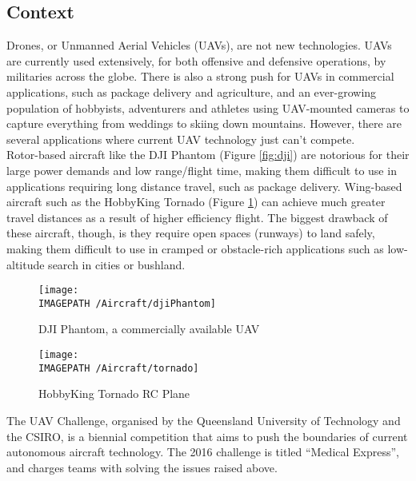 \subsection{Context}
Drones, or Unmanned Aerial Vehicles (UAVs), are not new technologies. UAVs are currently used extensively, for both offensive\cite{ref:offence} and defensive\cite{ref:defence} operations, by militaries across the globe. There is also a strong push for UAVs in commercial applications, such as package delivery\cite{ref:package} and agriculture\cite{ref:agriculture}, and an ever-growing population of hobbyists\cite{ref:hobby}, adventurers\cite{ref:adventure} and athletes\cite{ref:sport} using UAV-mounted cameras to capture everything from weddings to skiing down mountains. However, there are several applications where current UAV technology just can't compete.\\

Rotor-based aircraft like the DJI Phantom (Figure \ref{fig:dji}) are notorious for their  large power demands and low range/flight time, making them difficult to use in applications requiring long distance travel, such as package delivery. Wing-based aircraft such as the HobbyKing Tornado\cite{ref:tornado} (Figure \ref{fig:tornado}) can achieve much greater travel distances as a result of higher efficiency flight. The biggest drawback of these aircraft, though, is they require open spaces (runways) to land safely, making them difficult to use in cramped or obstacle-rich applications such as low-altitude search in cities or bushland.

\begin{figure}[!ht]
	\centering
	\begin{minipage}{.5\textwidth}
		\centering
		\texttt{[image: \\IMAGEPATH /Aircraft/djiPhantom]}
		\caption{DJI Phantom, a commercially available UAV}
		\label{fig:dji}
	\end{minipage}%
	\begin{minipage}{.5\textwidth}
		\centering
		\texttt{[image: \\IMAGEPATH /Aircraft/tornado]}
		\caption{HobbyKing Tornado RC Plane}
		\label{fig:tornado}
	\end{minipage}
\end{figure}
 
The UAV Challenge\cite{ref:challenge}, organised by the Queensland University of Technology and the CSIRO, is a biennial competition that aims to push the boundaries of current autonomous aircraft technology. The 2016 challenge is titled ``Medical Express'', and charges teams with solving the issues raised above.\\

